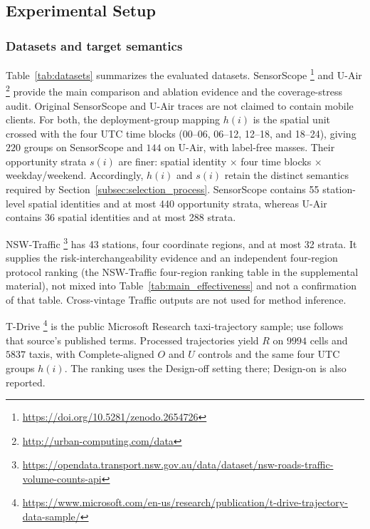 \documentclass[letterpaper,journal]{IEEEtran}
\begin{document}
\subsection{Experimental Setup}
\label{subsec:eval_setup}

\subsubsection{Datasets and target semantics}

Table~\ref{tab:datasets} summarizes the evaluated datasets.  SensorScope
\cite{ingelrest2010sensorscope,barrenetxea2019sensorscope}\footnote{\url{https://doi.org/10.5281/zenodo.2654726}}
and U-Air
\cite{zheng2013uair}\footnote{\url{http://urban-computing.com/data}}
provide the main comparison and ablation evidence and the coverage-stress audit.
Original SensorScope and U-Air traces are not claimed to contain mobile
clients.  For both, the deployment-group mapping $h(i)$ is the spatial unit
crossed with the four UTC time blocks (00--06, 06--12, 12--18, and 18--24),
giving $220$ groups on SensorScope and $144$ on U-Air, with label-free
masses.  Their opportunity strata $s(i)$ are finer: spatial identity
$\times$ four time blocks $\times$ weekday/weekend.
Accordingly, $h(i)$ and $s(i)$ retain the distinct semantics required by
Section~\ref{subsec:selection_process}.  SensorScope contains 55 station-level
spatial identities and at most 440 opportunity strata, whereas U-Air contains
36 spatial identities and at most 288 strata.

NSW-Traffic
\cite{tfnsw2024traffic}\footnote{\url{https://opendata.transport.nsw.gov.au/data/dataset/nsw-roads-traffic-volume-counts-api}}
has 43 stations, four coordinate regions, and at most 32 strata.  It
supplies the risk-interchangeability evidence and an independent four-region protocol ranking
(the NSW-Traffic four-region ranking table in the supplemental material), not mixed into
Table~\ref{tab:main_effectiveness} and not a confirmation of that table.  Cross-vintage Traffic outputs are
not used for method inference.

T-Drive
\cite{yuan2010tdrive}\footnote{\url{https://www.microsoft.com/en-us/research/publication/t-drive-trajectory-data-sample/}}
is the public Microsoft Research taxi-trajectory sample; use follows that
source's published terms.  Processed trajectories yield $R$ on $9994$
cells and $5837$ taxis, with Complete-aligned $O$ and $U$ controls and
the same four UTC groups $h(i)$.  The ranking uses the Design-off setting
there; Design-on is also reported.
\end{document}
